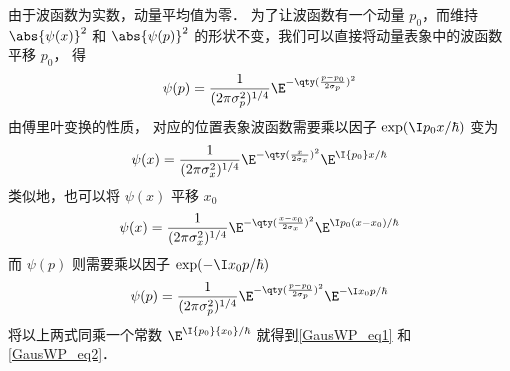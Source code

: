 由于波函数为实数，动量平均值为零．%
为了让波函数有一个动量 $p_0$，而维持 $\abs{\psi(x)}^2$ 和 $\abs{\psi(p)}^2$ %
的形状不变，我们可以直接将动量表象中的波函数平移 $p_0$， 得
\begin{equation}
\psi (p) = \frac{1}{(2\pi\sigma_p^2)^{1/4}} \E^{-\qty(\frac{p - p_0}{2\sigma_p})^2}
\end{equation}
由傅里叶变换的性质，%
对应的位置表象波函数需要乘以因子 $\exp(\I p_0 x/\hbar)$ 变为
\begin{equation}
\psi(x) = \frac{1}{(2\pi\sigma_x^2)^{1/4}} \E^{-\qty(\frac{x}{2\sigma_x})^2} {\E^{\I {p_0}x/{\hbar }}}
\end{equation}
类似地，也可以将 $\psi(x)$ 平移 $x_0$ 
\begin{equation}
\psi (x) = \frac{1}{(2\pi\sigma_x^2)^{1/4}} \E^{-\qty(\frac{x-x_0}{2\sigma_x})^2} \E^{\I p_0 (x-x_0)/\hbar}
\end{equation}
而 $\psi(p)$ 则需要乘以因子 $\exp (-\I x_0 p/\hbar)$
\begin{equation}
\psi(p) = \frac{1}{(2\pi\sigma_p^2)^{1/4}} \E^{-\qty(\frac{p - p_0}{2\sigma_p})^2} \E^{-\I x_0 p/\hbar}
\end{equation}
将以上两式同乘一个常数%
 ${\E^{\I{p_0}{x_0}/\hbar }}$ 就得到\autoref{GausWP_eq1} 和\autoref{GausWP_eq2}．

